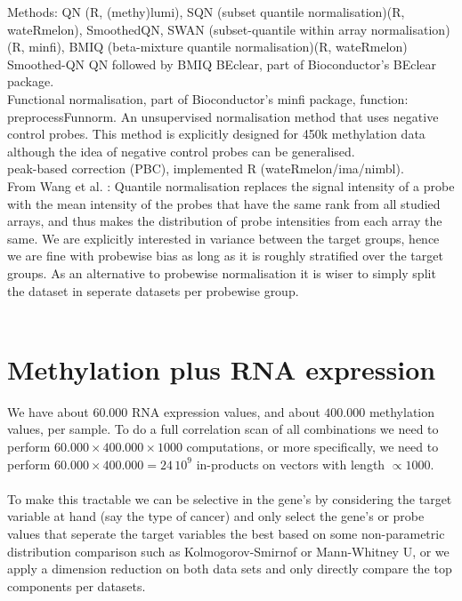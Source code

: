 \documentclass[a4paper,10pt]{article}
\begin{document}
Methods: 
QN  (R, (methy)lumi), 
SQN (subset quantile normalisation)(R, wateRmelon), 
SmoothedQN,
SWAN (subset-quantile within array normalisation)(R, minfi),
BMIQ (beta-mixture quantile normalisation)(R, wateRmelon)
Smoothed-QN
QN followed by BMIQ
%
BEclear, part of Bioconductor's BEclear package. \\
%
Functional normalisation, part of Bioconductor's minfi package, function: preprocessFunnorm. An unsupervised 
normalisation method that uses negative control probes. This method is explicitly designed for 450k methylation
data although the idea of negative control probes can be generalised. \\

peak-based correction (PBC), implemented R (wateRmelon/ima/nimbl). \\ 

From Wang et al. \cite{Wang2015}: Quantile normalisation replaces the signal intensity of a probe with the mean intensity of the probes that have the same rank from all studied arrays, and thus makes the distribution of probe intensities from each array the same. We are explicitly interested in variance between the target groups, hence we are fine with probewise bias
as long as it is roughly stratified over the target groups. As an alternative to probewise normalisation it is wiser
to simply split the dataset in seperate datasets per probewise group. \\ \\
%

\section{Methylation plus RNA expression}
%
We have about $60.000$ RNA expression values, and about $400.000$ methylation values, per sample.
To do a full correlation scan of all combinations we need to perform $60.000\times 400.000 \times 1000$ computations, 
or more specifically, we need to perform $60.000\times 400.000=24\,10^9$ in-products on vectors with length $\propto 1000$. \\ \\
%
To make this tractable we can be selective in the gene's by considering the target variable at hand (say the type 
of cancer) and only select the gene's or probe values that seperate the target variables the best based 
on some non-parametric distribution comparison such as Kolmogorov-Smirnof or Mann-Whitney U, or we apply 
a dimension reduction on both data sets and only directly compare  the top components per datasets.
\end{document}
